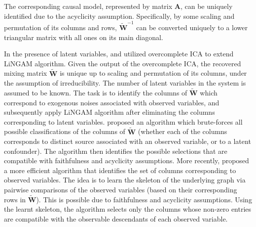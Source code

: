 \documentclass[12pt]{article}
\newcommand{\bA}{\mathbf{A}}
\newcommand{\bW}{\mathbf{W}}
\begin{document}
The corresponding causal model, represented by matrix $\bA$, can be uniquely identified due to the acyclicity assumption. Specifically, by some scaling and permutation of its columns and rows, $\tilde{\bW}^{-1}$ can be converted uniquely to a lower triangular matrix with all ones on its main diagonal. 

In the presence of latent variables, \citet{hoyer2008estimation} and \citet{salehkaleybar2020learning} utilized overcomplete ICA to extend LiNGAM algorithm. Given the output of the overcomplete ICA, the recovered mixing matrix $\tilde{\bW}$ is unique up to scaling and permutation of its columns, under the assumption of irreducibility. The number of latent variables in the system is assumed to be known. The task is to identify the columns of $\tilde{\bW}$ which correspond to exogenous noises associated with observed variables, and subsequently apply LiNGAM algorithm after eliminating the columns corresponding to latent variables. \citet{hoyer2008estimation} proposed an algorithm which brute-forces all possible classifications of the columns of $\tilde{\bW}$ (whether each of the columns corresponds to distinct source associated with an observed variable, or to a latent confounder). The algorithm then identifies the possible selections that are compatible with faithfulness and acyclicity assumptions. More recently, \citet{salehkaleybar2020learning} proposed a more efficient algorithm that identifies the set of columns corresponding to observed variables. The idea is to learn the skeleton of the underlying graph via pairwise comparisons of the observed variables (based on their corresponding rows in $\tilde{\bW}$). This is possible due to faithfulness and acyclicity assumptions. Using the learnt skeleton, the algorithm selects only the columns whose non-zero entries are compatible with the observable descendants of each observed variable. 
\end{document}
